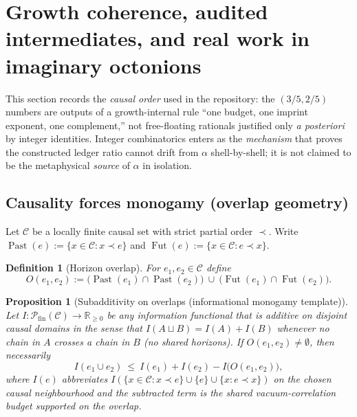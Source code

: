 \documentclass[11pt]{amsart}
\newtheorem{proposition}[theorem]{Proposition}
\newtheorem{definition}[theorem]{Definition}
\begin{document}
\section[Growth coherence and audited intermediates]{Growth coherence, audited intermediates, and real work in imaginary octonions}
\label{sec:diophantine-audit}

This section records the \emph{causal order} used in the repository: the \((3/5,2/5)\) numbers are outputs of a growth-internal rule ``one budget, one imprint exponent, one complement,'' not free-floating rationals justified only \emph{a posteriori} by integer identities. Integer combinatorics enters as the \emph{mechanism} that proves the constructed ledger ratio cannot drift from \(\alpha\) shell-by-shell; it is not claimed to be the metaphysical \emph{source} of \(\alpha\) in isolation.

\subsection{Causality forces monogamy (overlap geometry)}

Let \(\mathcal{C}\) be a locally finite causal set with strict partial order \(\prec\). Write \(\operatorname{Past}(e):=\{x\in\mathcal{C}:x\prec e\}\) and \(\operatorname{Fut}(e):=\{x\in\mathcal{C}:e\prec x\}\).

\begin{definition}[Horizon overlap]
\label{def:horizon-overlap}
For \(e_1,e_2\in\mathcal{C}\) define
\[
O(e_1,e_2):=\bigl(\operatorname{Past}(e_1)\cap \operatorname{Past}(e_2)\bigr)\ \cup\ \bigl(\operatorname{Fut}(e_1)\cap \operatorname{Fut}(e_2)\bigr).
\]
\end{definition}

\begin{proposition}[Subadditivity on overlaps (informational monogamy template)]
\label{prop:subadditivity-monogamy}
Let \(I:\mathcal{P}_{\mathrm{fin}}(\mathcal{C})\to \mathbb{R}_{\ge 0}\) be any information functional that is additive on \emph{disjoint} causal domains in the sense that \(I(A\sqcup B)=I(A)+I(B)\) whenever no chain in \(A\) crosses a chain in \(B\) (no shared horizons). If \(O(e_1,e_2)\neq\emptyset\), then necessarily
\begin{equation}
\label{eq:subadd}
I(e_1\cup e_2)\ \le\ I(e_1)+I(e_2)-I\bigl(O(e_1,e_2)\bigr),
\end{equation}
where \(I(e)\) abbreviates \(I(\{x\in\mathcal{C}:x\prec e\}\cup\{e\}\cup\{x:e\prec x\})\) on the chosen causal neighbourhood and the subtracted term is the shared vacuum-correlation budget supported on the overlap.
\end{proposition}
\end{document}
